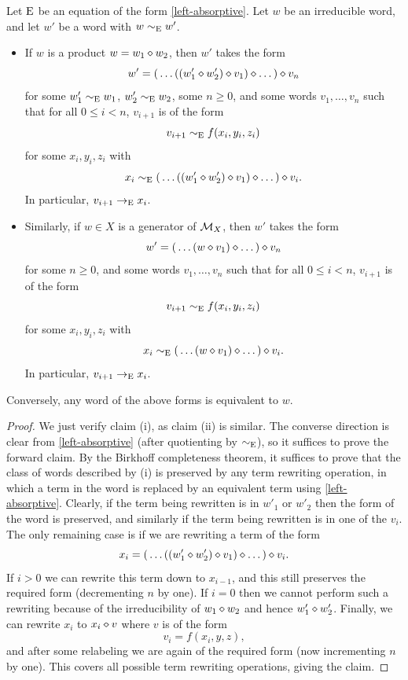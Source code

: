 \begin{theorem}\label{irred-desc}  Let $\mathrm{E}$ be an equation of the form \eqref{left-absorptive}.  Let $w$ be an irreducible word, and let $w'$ be a word with $w \sim_{\mathrm{E}} w'$.
  \setlength{\parskip}{0pt}
  \begin{itemize}
    \item[(i)] If $w$ is a product $w = w_1 \diamond w_2$, then $w'$ takes the form
$$ w' = ({}\dots((w'_1 \diamond w'_2) \diamond v_1) \diamond \dots{}) \diamond v_n$$
for some $w'_1 \sim_{\mathrm{E}} w_1$, $w'_2 \sim_{\mathrm{E}} w_2$, some $n \geq 0$, and some words $v_1, \dots, v_n$ such that for all $0 \leq i < n$, $v_{i+1}$ is of the form
$$ v_{i+1} \sim_{\mathrm{E}} f(x_i,y_i,z_i)$$
for some $x_i, y_i, z_i$ with
$$ x_i \sim_{\mathrm{E}} ({}\dots((w'_1 \diamond w'_2) \diamond v_1) \diamond \dots{}) \diamond v_i.$$
In particular, $v_{i+1} \to_{\mathrm{E}} x_i$.
  \item[(ii)] Similarly, if $w \in X$ is a generator of ${\mathcal{M}}_X$, then $w'$ takes the form
$$ w' = ({}\dots(w \diamond v_1) \diamond \dots {}) \diamond v_n$$
for some $n \geq 0$, and some words $v_1, \dots, v_n$ such that for all $0 \leq i < n$, $v_{i+1}$ is of the form
$$ v_{i+1} \sim_{\mathrm{E}} f(x_i,y_i,z_i)$$
for some $x_i, y_i, z_i$ with
$$ x_i \sim_{\mathrm{E}} ({}\dots(w \diamond v_1) \diamond \dots{}) \diamond v_i.$$
In particular, $v_{i+1} \to_{\mathrm{E}} x_i$.
\end{itemize}
Conversely, any word of the above forms is equivalent to $w$.
\end{theorem}

\begin{proof}  We just verify claim (i), as claim (ii) is similar.  The converse direction is clear from \eqref{left-absorptive} (after quotienting by $\sim_{\mathrm{E}}$), so it suffices to prove the forward claim. By the Birkhoff completeness theorem, it suffices to prove that the class of words described by (i) is preserved by any term rewriting operation, in which a term in the word is replaced by an equivalent term using \eqref{left-absorptive}.  Clearly, if the term being rewritten is in $w'_1$ or $w'_2$ then the form of the word is preserved, and similarly if the term being rewritten is in one of the $v_i$.  The only remaining case is if we are rewriting a term of the form
$$ x_i = ({}\dots((w'_1 \diamond w'_2) \diamond v_1) \diamond \dots{}) \diamond v_i.$$
If $i>0$ we can rewrite this term down to $x_{i-1}$, and this still preserves the required form (decrementing $n$ by one).  If $i=0$ then we cannot perform such a rewriting because of the irreducibility of $w_1 \diamond w_2$ and hence $w'_1 \diamond w'_2$.  Finally, we can rewrite $x_i$ to $x_i \diamond v$ where $v$ is of the form
$$ v_i = f(x_i,y,z),$$
and after some relabeling we are again of the required form (now incrementing $n$ by one). This covers all possible term rewriting operations, giving the claim.
\end{proof}

